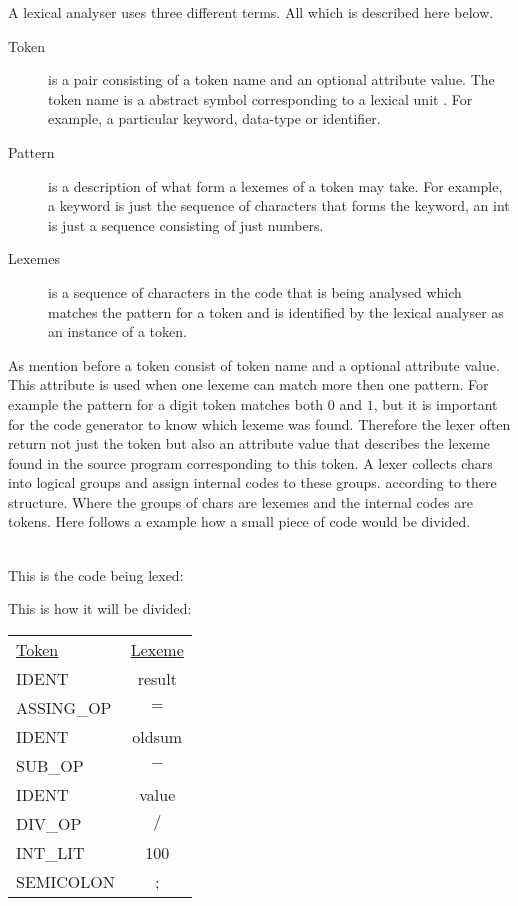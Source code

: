 A lexical analyser uses three different terms. All which is described here 
below. 
\begin{description}
  \item[Token]
    is a pair consisting of a token name and an optional attribute value. The 
token name is a abstract symbol corresponding to a lexical unit \cite{Aho2006}. 
For example, a particular keyword, data-type or identifier.
  \item[Pattern]
    is a description of what form a lexemes of a token may take. \cite{Aho2006} 
For example, a keyword is just the sequence of characters that forms the 
keyword, an int is just a sequence consisting of just numbers. 
  \item[Lexemes]
    is a sequence of characters in the code that is being analysed which 
matches the pattern for a token and is identified by the lexical analyser as an 
instance of a token. \cite{Aho2006}
\end{description}
As mention before a token consist of token name and a optional attribute value. 
This attribute is used when one lexeme can match more then one pattern. \cite
{Aho2006} For example the pattern for a digit token matches both $0$ and $1$, 
but it is important for the code generator to know which lexeme was found. 
Therefore the lexer often return not just the token but also an attribute value 
that describes the lexeme found in the source program corresponding to this 
token. \cite{Aho2006} A lexer collects chars into logical groups and assign 
internal codes to these groups. according to there structure.\cite{sebesta2012} 
Where the groups of chars are lexemes and the internal codes are tokens. Here 
follows a example how a small piece of code would be divided.
\begin{example} \label{codeToToken} \cite{sebesta2012} \\
This is the code being lexed:

This is how it will be divided:
\begin{center}
\begin{tabular}{l c}
\underline{Token} & \underline{Lexeme}\\
IDENT & result\\
ASSING\_OP & $=$\\
IDENT & oldsum\\
SUB\_OP & $-$\\
IDENT & value\\
DIV\_OP & $/$\\
INT\_LIT & 100\\
SEMICOLON & ;
\end{tabular}
\end{center}
\end{example}

